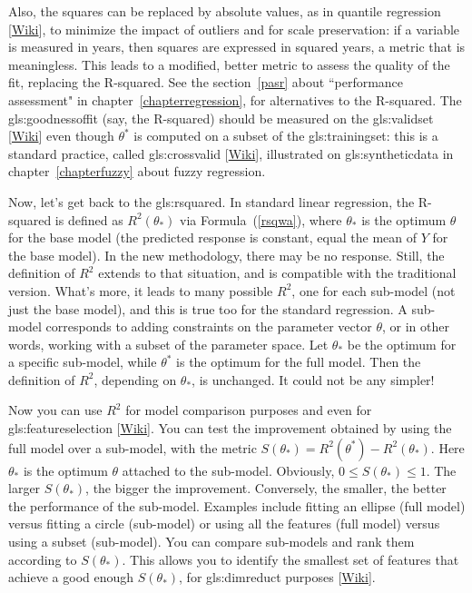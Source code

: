 \documentclass[oneside,10pt]{book}
\begin{document}
Also, the squares 
 can be replaced by absolute values, as in \textcolor{index}{quantile regression} [\href{https://en.wikipedia.org/wiki/Quantile_regression}{Wiki}], to minimize the impact of outliers and for scale preservation: if a variable is measured in years, then squares are expressed in squared years, a metric that is meaningless. This leads to a modified, better metric to assess the quality of the fit, replacing the R-squared.  See the section~\ref{pasr} about ``performance
 assessment" in chapter~\ref{chapterregression}, for alternatives to the R-squared. 
The \gls{gls:goodnessoffit} (say, the R-squared) should be measured on the \gls{gls:validset}
 [\href{https://en.wikipedia.org/wiki/Training,_validation,_and_test_data_sets}{Wiki}] even though $\theta^*$ is computed on a subset of the \gls{gls:trainingset}: this is a standard practice, called \gls{gls:crossvalid} [\href{https://en.wikipedia.org/wiki/Cross-validation_(statistics)}{Wiki}], 
 illustrated on \gls{gls:syntheticdata} in chapter~\ref{chapterfuzzy} about fuzzy regression.

Now, let's get back to the 
\gls{gls:rsquared}. In standard linear regression, the R-squared is defined as $R^2(\theta_*)$ via 
 Formula~(\ref{rsqwa}), where 
 $\theta_*$ is the optimum $\theta$ for the base model (the predicted response is constant, equal the mean of $Y$ for the base model). In the
 new methodology, there may be no response. Still, the definition of $R^2$ extends to that situation, and is compatible with the traditional version.
 What's more, it leads to many possible $R^2$, one for each sub-model (not just the base model), and this is true too for the standard regression. 
A sub-model corresponds to adding constraints on the parameter vector $\theta$, or in other words, working with a subset of the parameter space. Let $\theta_*$ be the optimum for a specific sub-model, while $\theta^*$ is the optimum for the full model. Then the definition of $R^2$, depending on $\theta_*$, is unchanged. It could not be any simpler! 

Now you can use $R^2$ for model comparison purposes and even for \gls{gls:featureselection} [\href{https://en.wikipedia.org/wiki/Feature_selection}{Wiki}]. You can test the improvement obtained by using the full model over a sub-model,  
 with the metric $S(\theta_*)= R^2(\theta^*)-R^2(\theta_*)$. Here $\theta_*$ is the optimum $\theta$ attached to the sub-model. Obviously, $0\leq S(\theta_*)\leq 1$. The larger $S(\theta_*)$, the bigger the improvement. Conversely, the smaller, the better the performance of the sub-model. Examples include fitting an ellipse (full model) versus fitting a circle (sub-model) or using all the features (full model) versus using a subset (sub-model). 
You can compare sub-models and rank them according to $S(\theta_*)$. This allows you to identify the smallest set of features that achieve a good
 enough $S(\theta_*)$, for 
\gls{gls:dimreduct}
 purposes [\href{https://en.wikipedia.org/wiki/Dimensionality_reduction}{Wiki}]. 
\end{document}
